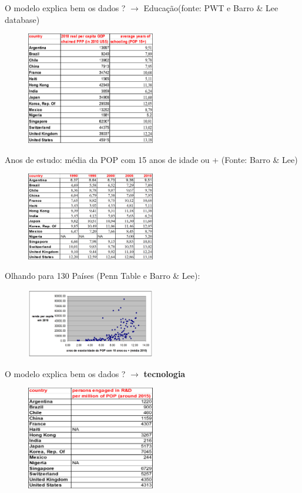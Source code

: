 \documentclass[a4paper,12pt]{article}[abntex2]
\begin{document}
O modelo explica bem os dados ? $\rightarrow$ Educação(fonte: PWT e Barro \& Lee database)
\begin{figure}[H]
        \centering
        \includegraphics[width=0.5\textwidth]{Imagens/a1i16.png}
\end{figure}




Anos de estudo: média da POP com 15 anos de idade ou + (Fonte: Barro \& Lee)

\begin{figure}[H]
        \centering
        \includegraphics[width=0.5\textwidth]{Imagens/a1i17.png}
\end{figure}

Olhando para 130 Países (Penn Table e Barro \& Lee):

\begin{figure}[H]
        \centering
        \includegraphics[width=0.5\textwidth]{Imagens/a1i18.png}
\end{figure}

O modelo explica bem os dados ?  $\rightarrow$ \textbf{tecnologia}


\begin{figure}[H]
        \centering
        \includegraphics[width=0.5\textwidth]{Imagens/a1i19.png}
\end{figure}
\end{document}
